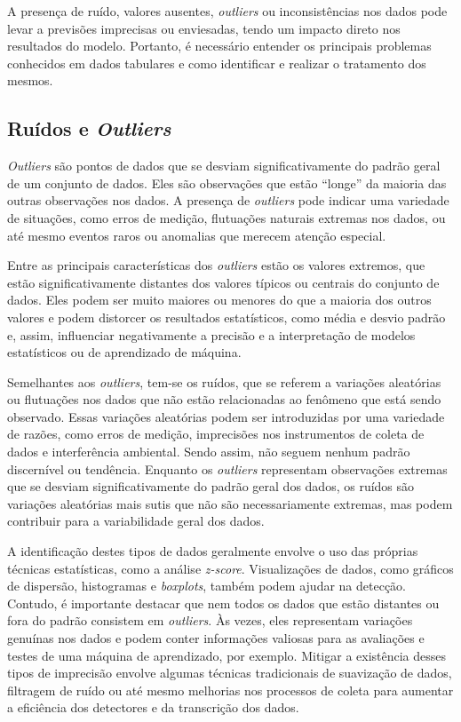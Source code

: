 \documentclass[tcc2]{uftex}
\begin{document}
A presença de ruído, valores ausentes, \textit{outliers} ou inconsistências nos dados pode levar a previsões imprecisas ou enviesadas, tendo um impacto direto nos resultados do modelo. Portanto, é necessário entender os principais problemas conhecidos em dados tabulares e como identificar e realizar o tratamento dos mesmos.

\subsection{Ruídos e \textit{Outliers}}

\textit{Outliers} são pontos de dados que se desviam significativamente do padrão geral de um conjunto de dados. Eles são observações que estão ``longe'' da maioria das outras observações nos dados. A presença de \textit{outliers} pode indicar uma variedade de situações, como erros de medição, flutuações naturais extremas nos dados, ou até mesmo eventos raros ou anomalias que merecem atenção especial.

Entre as principais características dos \textit{outliers} estão os valores extremos, que estão significativamente distantes dos valores típicos ou centrais do conjunto de dados. Eles podem ser muito maiores ou menores do que a maioria dos outros valores e podem distorcer os resultados estatísticos, como média e desvio padrão e, assim, influenciar negativamente a precisão e a interpretação de modelos estatísticos ou de aprendizado de máquina.

Semelhantes aos \textit{outliers}, tem-se os ruídos, que se referem a variações aleatórias ou flutuações nos dados que não estão relacionadas ao fenômeno que está sendo observado. Essas variações aleatórias podem ser introduzidas por uma variedade de razões, como erros de medição, imprecisões nos instrumentos de coleta de dados e interferência ambiental. Sendo assim, não seguem nenhum padrão discernível ou tendência. Enquanto os \textit{outliers} representam observações extremas que se desviam significativamente do padrão geral dos dados, os ruídos são variações aleatórias mais sutis que não são necessariamente extremas, mas podem contribuir para a variabilidade geral dos dados.

A identificação destes tipos de dados geralmente envolve o uso das próprias técnicas estatísticas, como a análise \textit{z-score}. Visualizações de dados, como gráficos de dispersão, histogramas e \textit{boxplots}, também podem ajudar na detecção. Contudo, é importante destacar que nem todos os dados que estão distantes ou fora do padrão consistem em \textit{outliers}. Às vezes, eles representam variações genuínas nos dados e podem conter informações valiosas para as avaliações e testes de uma máquina de aprendizado, por exemplo. Mitigar a existência desses tipos de imprecisão envolve algumas técnicas tradicionais de suavização de dados, filtragem de ruído ou até mesmo melhorias nos processos de coleta para aumentar a eficiência dos detectores e da transcrição dos dados.
\end{document}
